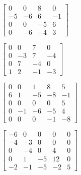 \begin{exercise}
\begin{parts}
\item \(\begin{bmatrix} 0 & 0 & 8 & 0
\\-5 & -6 & 6 & -1
\\0 & 0 & -5 & 6
\\0 & -6 & -4 & 3 \end{bmatrix}\)

\item \(\begin{bmatrix} 0 & 0 & 7 & 0
\\0 & -3 & 7 & -4
\\0 & 7 & -4 & 0
\\1 & 2 & -1 & -3 \end{bmatrix}\)

\item \(\begin{bmatrix} 0 & 0 & 1 & 8 & 5
\\6 & 1 & -5 & -8 & -1
\\0 & 0 & 0 & 0 & 5
\\0 & -1 & -6 & -5 & 4
\\0 & 0 & 0 & -1 & -8 \end{bmatrix}\)

\item \(\begin{bmatrix} -6 & 0 & 0 & 0 & 0
\\-4 & -3 & 0 & 0 & 0
\\0 & -4 & 0 & 4 & 0
\\0 & 1 & -5 & 12 & 0
\\-2 & -1 & -5 & -2 & 5 \end{bmatrix}\)

\end{parts}
\end{exercise}




